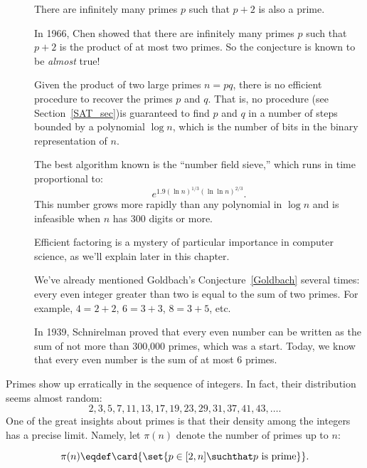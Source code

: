 \begin{description}

\item[] There are infinitely many primes
  $p$ such that $p + 2$ is also a prime.

  In 1966, Chen showed that there are infinitely many primes $p$ such
  that $p + 2$ is the product of at most two primes.  So the
  conjecture is known to be \emph{almost} true!

\item[] Given the product
  of two large primes $n = pq$, there is no efficient procedure to
  recover the primes $p$ and $q$.  That is, no \emph{} procedure (see Section~\ref{SAT_sec})is guaranteed to
  find $p$ and $q$ in a number of steps bounded by a polynomial $\log
  n$, which is the number of bits in the binary representation of $n$.

  The best algorithm known is the ``number field sieve,'' which runs
  in time proportional to:
  \[
  e^{1.9(\ln n)^{1/3} (\ln\ln n)^{2/3}}.
  \]
  This number grows more rapidly than any polynomial in $\log n$ and
  is infeasible when $n$ has 300 digits or more.

  Efficient factoring is a mystery of particular importance in
  computer science, as we'll explain later in this chapter.

\item[] We've already mentioned Goldbach's
  Conjecture~\ref{Goldbach} several times: every even integer greater
  than two is equal to the sum of two primes.  For example, $4 = 2 +
  2$, $6 = 3 + 3$, $8 = 3 + 5$, etc.

  In 1939, Schnirelman proved that every even number can be written as
  the sum of not more than 300,000 primes, which was a start.  Today,
  we know that every even number is the sum of at most 6 primes.
\end{description}

Primes show up erratically in the sequence of integers.  In fact,
their distribution seems almost random:
\[
2, 3, 5, 7, 11, 13, 17, 19, 23, 29, 31, 37, 41, 43, \dots.
\]
One of the great insights about primes is that their density among the
integers has a precise limit.  Namely, let $\pi(n)$ denote the number
of primes up to $n$:

\begin{definition}\label{def:prime<x}
\[
  \pi(n) \eqdef \card{\set{p \in [2, n] \suchthat p \text{ is
        prime}}}.
\]
\end{definition}

